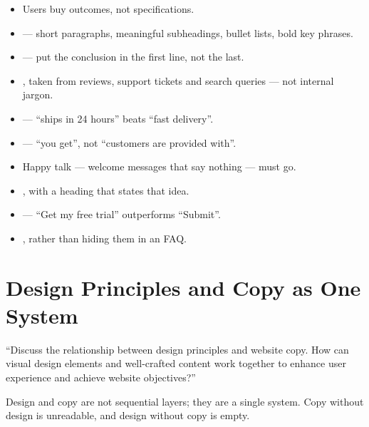 \documentclass{MMTextbook}
\begin{document}
\begin{itemize}
\item {} Users buy outcomes, not
      specifications.
\item {} --- short paragraphs, meaningful subheadings,
      bullet lists, bold key phrases.
\item {} --- put the conclusion in the first line, not the
      last.
\item {}, taken from reviews, support tickets and
      search queries --- not internal jargon.
\item {} --- ``ships in 24 hours'' beats ``fast delivery''.
\item {} --- ``you get'', not
      ``customers are provided with''.
\item {} Happy talk --- welcome messages that say nothing
      --- must go.
\item {}, with a heading that states that idea.
\item {} --- ``Get my free trial''
      outperforms ``Submit''.
\item {}, rather than hiding
      them in an FAQ.
\end{itemize}

\section{Design Principles and Copy as One System}

\begin{keybox}
``Discuss the relationship between design principles and website copy. How can
visual design elements and well-crafted content work together to enhance user
experience and achieve website objectives?''
\end{keybox}

Design and copy are not sequential layers; they are a single system. Copy without
design is unreadable, and design without copy is empty.
\end{document}
